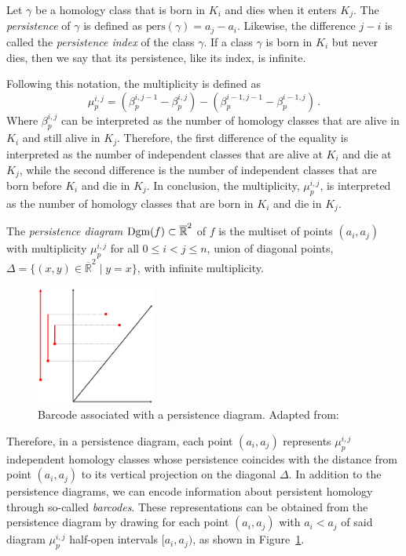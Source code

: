 \documentclass[../main.tex]{subfiles}
\begin{document}
\begin{definition}
Let $\gamma$ be a homology class that is born in $K_i$ and dies when it enters $K_j$. The \emph{persistence} of $\gamma$ is defined as $\text{pers}(\gamma)= a_j - a_i$. Likewise, the difference $j-i$ is called the \emph{persistence index} of the class $\gamma$. If a class $\gamma$ is born in $K_i$ but never dies, then we say that its persistence, like its index, is infinite.
\end{definition}

Following this notation, the multiplicity is defined as
\[
\mu_p^{i,j} = (\beta_p^{i,j-1}-\beta_p^{i,j})-(\beta_p^{i-1, j-1}-\beta_p^{i-1, j})\,.
\]
Where $\beta_p^{i, j}$ can be interpreted as the number of homology classes that are alive in $K_i$ and still alive in $K_{j}$. Therefore, the first difference of the equality is interpreted as the number of independent classes that are alive at $K_i$ and die at $K_j$, while the second difference is the number of independent classes that are born before $K_i$ and die in $K_j$. In conclusion, the multiplicity, $\mu_p^{i, j}$, is interpreted as the number of homology classes that are born in $K_i$ and die in $K_j$.


\begin{definition}
The \emph{persistence diagram} $\text{Dgm}(f) \subset \overline{\mathbb{R}}^2$ of $f$ is the multiset of points $(a_i, a_j)$ with multiplicity $ \mu_p^{i, j}$ for all $0 \leq i < j \leq n$, union of diagonal points, $\Delta=\{(x, y) \in \overline{\mathbb{R }}^2 \mid y = x\}$, with infinite multiplicity.
\end{definition}

\begin{figure}[!ht]
\centering
\includegraphics[width=0.35\textwidth]{figures/bg/The-Persistence-Diagram-Associated-to-a-Barcode.png} 
\caption{Barcode associated with a persistence diagram. Adapted from: \cite{curry_fiber_2019}}
\label{fig:codigoBarras}
\end{figure}

Therefore, in a persistence diagram, each point $(a_i, a_j)$ represents $\mu_p^{i, j}$ independent homology classes whose persistence coincides with the distance from point $(a_i, a_j)$ to its vertical projection on the diagonal $\Delta $. In addition to the persistence diagrams, we can encode information about persistent homology through so-called \emph{barcodes}. These representations can be obtained from the persistence diagram by drawing for each point $(a_i, a_j)$ with $a_i < a_j$ of said diagram $\mu_p^{i, j}$ half-open intervals $[a_i, a_j) $, as shown in Figure~\ref{fig:codigoBarras}.\\
\end{document}
